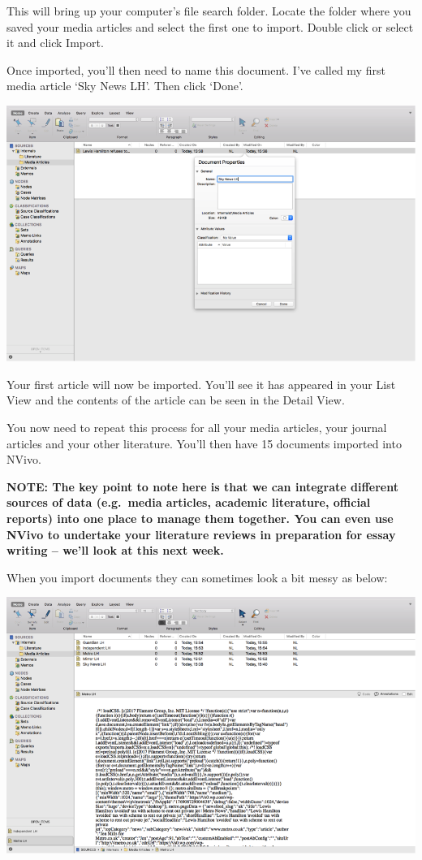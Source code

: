 \documentclass[]{book}
\theoremstyle{definition}
\theoremstyle{definition}
\theoremstyle{definition}
\theoremstyle{remark}
\begin{document}
This will bring up your computer's file search folder. Locate the folder
where you saved your media articles and select the first one to import.
Double click or select it and click Import.

Once imported, you'll then need to name this document. I've called my
first media article `Sky News LH'. Then click `Done'.

\includegraphics{imgs/qual_15.png}

Your first article will now be imported. You'll see it has appeared in
your List View and the contents of the article can be seen in the Detail
View.

You now need to repeat this process for all your media articles, your
journal articles and your other literature. You'll then have 15
documents imported into NVivo.

\textbf{NOTE: The key point to note here is that we can integrate
different sources of data (e.g.~media articles, academic literature,
official reports) into one place to manage them together. You can even
use NVivo to undertake your literature reviews in preparation for essay
writing -- we'll look at this next week.}

When you import documents they can sometimes look a bit messy as below:

\includegraphics{imgs/qual_16.png}
\end{document}

